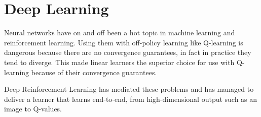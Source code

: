 \chapter{Deep Learning}
Neural networks have on and off
been a hot topic in machine learning and reinforcement learning.
Using them with off-policy learning like Q-learning
is dangerous because there are no convergence guarantees,
in fact in practice they tend to diverge.
This made linear learners the superior choice
for use with Q-learning
because of their convergence guarantees.

Deep Reinforcement Learning has mediated these problems
and has managed to deliver a learner
that learns end-to-end,
from high-dimensional output such as an image
to Q-values.